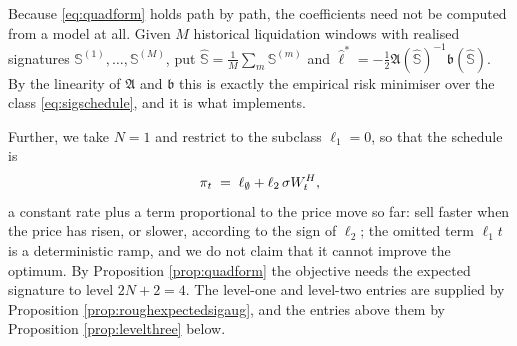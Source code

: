 \begin{remark}\label{rem:erm}
Because \eqref{eq:quadform} holds path by path, the coefficients need not be computed from a model at
all. Given $M$ historical liquidation windows with realised signatures
$\mathbb{S}^{(1)},\dots,\mathbb{S}^{(M)}$, put
$\widehat{\mathbb{S}}=\tfrac1M\sum_{m}\mathbb{S}^{(m)}$ and
$\widehat\ell^{*}=-\tfrac12\mathfrak{A}(\widehat{\mathbb{S}})^{-1}\mathfrak{b}(\widehat{\mathbb{S}})$. By the
linearity of $\mathfrak{A}$ and $\mathfrak{b}$ this is exactly the empirical risk minimiser over the class
\eqref{eq:sigschedule}, and it is what \cite{kalsi2020} implements.

\end{remark}


Further, we take $N=1$ and restrict to the subclass $\ell_{1}=0$, so that the schedule is
\begin{equation}\label{eq:worked}
  \pi_t \;=\; \ell_\emptyset+\ell_2\,\sigma W^{H}_t ,
\end{equation}
a constant rate plus a term proportional to the price move so far: sell faster when the price has
risen, or slower, according to the sign of $\ell_2$; the omitted term $\ell_{1}t$ is a deterministic
ramp, and we do not claim that it cannot improve the optimum. By Proposition \ref{prop:quadform} the
objective needs the expected signature to level $2N+2=4$. The level-one and level-two entries are
supplied by Proposition \ref{prop:roughexpectedsigaug}, and the entries above them by Proposition
\ref{prop:levelthree} below.


